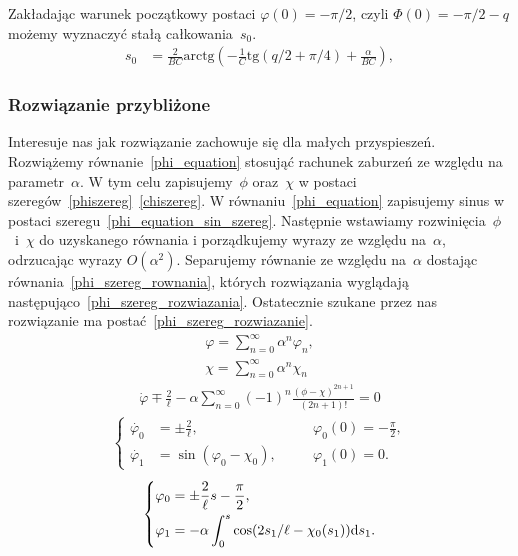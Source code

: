 Zakładając warunek początkowy postaci $\varphi(0) = -\pi/2$, 
czyli $\Phi(0) = -\pi/2 - q$ możemy wyznaczyć stałą całkowania~$s_0$.
\begin{align}
s_0 & = \frac{2}{BC} \text{arctg}  
\left( - \frac{1}{C}\text{tg} (q/2 + \pi/4) +\frac{\alpha}{BC} \right),
\end{align}

\subsubsection{Rozwiązanie przybliżone}
Interesuje nas jak rozwiązanie zachowuje się dla małych przyspieszeń. 
Rozwiążemy równanie~\eqref{phi_equation} stosująć 
rachunek zaburzeń ze względu na 
parametr~$\alpha$. W tym celu zapisujemy~$\phi$ oraz~$\chi$ w postaci
szeregów~\eqref{phiszereg}~\eqref{chiszereg}. 
W równaniu~\eqref{phi_equation} zapisujemy sinus w postaci 
szeregu~\eqref{phi_equation_sin_szereg}. Następnie wstawiamy 
rozwinięcia~$\phi$~i~$\chi$ do uzyskanego równania i porządkujemy wyrazy
ze względu na~$\alpha$, odrzucając wyrazy $O(\alpha^2)$. 
Separujemy równanie ze względu na~$\alpha$ dostając 
równania~\eqref{phi_szereg_rownania}, 
których rozwiązania wyglądają 
następująco~\eqref{phi_szereg_rozwiazania}.
Ostatecznie szukane przez nas rozwiązanie ma 
postać~\eqref{phi_szereg_rozwiazanie}.
\begin{align}\label{phiszereg}
\varphi = \sum_{n=0}^{\infty} \alpha^n \varphi_n, \\
\chi = \sum_{n=0}^{\infty} \alpha^n \chi_n  \label{chiszereg}
\end{align}
\begin{align}\label{phi_equation_sin_szereg}
\dot{\varphi} \mp \frac{2}{\ell} - \alpha
\sum_{n=0}^{\infty} (-1)^n \frac{(\phi-\chi)^{2n+1}}{(2n+1)!} =0
\end{align}
\begin{align}\label{phi_szereg_rownania}
\left\{ 
\begin{aligned}
\dot{\varphi_0} & = \pm \frac{2}{\ell} , &\quad & 
\varphi_0(0)=-\frac{\pi}{2},\\
\dot{\varphi_1} & = \sin (\varphi_0 - \chi_0  ), &\quad & 
\varphi_1(0) = 0 .
\end{aligned}
\right.
\end{align}
\begin{align}\label{phi_szereg_rozwiazania}
\left\{ 
\begin{aligned}
\varphi_0 & =  \pm \frac{2}{\ell}s - \frac{\pi}{2},\\
\varphi_1 & =  -\alpha \int_0^s \cos 
(2 s_1 / \ell  - \chi_0(s_1)  ) \text{d} s_1 .
\end{aligned}
\right.
\end{align}

